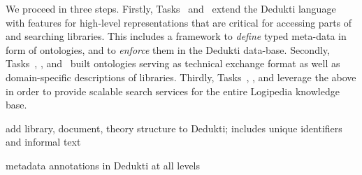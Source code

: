 \begin{workpackage}[id=structuring,wphases=0-48,type=RTD,
  short=Structured Theories and Metadata,%
  title=Structured Theories and Metadata,
  lead=Fau,
  BolRM=6,
  TumRM=6,
  FauRM=48,
  SacRM=48]
\begin{wpdescription}
We proceed in three steps.
Firstly, Tasks~ and~ extend the Dedukti language with features for high-level representations that are critical for accessing parts of and searching libraries.
This includes a framework to \emph{define} typed meta-data in form of ontologies, and to \emph{enforce} them in 
the Dedukti data-base.
Secondly, Tasks~, , and~ built ontologies serving as technical exchange format as well as domain-specific descriptions of libraries.
Thirdly, Tasks~, , and  leverage the above in order to provide scalable search services for the entire Logipedia knowledge base.
\end{wpdescription}

\begin{tasklist}
\begin{task}[id=strlibstructure,title=Library Structure,lead=Fau,FauRM=18]
add library, document, theory structure to Dedukti; includes unique identifiers and informal text

%
%
\end{task} 

\begin{task}[id=strdofimpl,title=Ontological Framework for Meta-Data,lead=Sac,SacRM=18]
metadata annotations in Dedukti at all levels
\end{task} 


\end{tasklist}
\end{workpackage}
